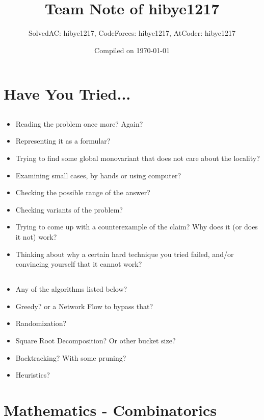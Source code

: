 \documentclass[landscape, 8pt, a4paper, oneside, twocolumn]{extarticle}
\title{Team Note of \textcolor{BOJ_RUBY_IV}{\textbf{hibye1217}}}
\author{SolvedAC: \textcolor{ARENA_SSP}{hibye1217}, CodeForces: \textcolor{CF_RED}{hibye1217}, AtCoder: \textcolor{AT_YELLOW}{hibye1217}}
\date{Compiled on \today}
\begin{document}
\thispagestyle{fancy}
\maketitlepage


\section{Have You Tried...}
\subsection{}
\begin{itemize}
	\item Reading the problem once more? Again?
	\item Representing it as a formular?
	\item Trying to find some global monovariant that does not care about the locality?
	\item Examining small cases, by hands or using computer?
	\item Checking the possible range of the answer?
	\item Checking variants of the problem?
	\item Trying to come up with a counterexample of the claim? Why does it (or does it not) work?
	\item Thinking about why a certain hard technique you tried failed, and/or convincing yourself that it cannot work?
\end{itemize}
\subsection{}
\begin{itemize}
	\item Any of the algorithms listed below?
	\item Greedy? or a Network Flow to bypass that?
	\item Randomization?
	\item Square Root Decomposition? Or other bucket size?
	\item Backtracking? With some pruning?
	\item Heuristics?
\end{itemize}
\section{Mathematics - Combinatorics}
\end{document}
